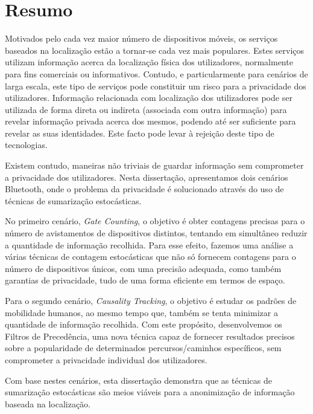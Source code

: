\chapter*{Resumo}
Motivados pelo cada vez maior número de dispositivos móveis, os
serviços baseados na localização estão a tornar-se cada vez mais
populares.  Estes serviços utilizam informação acerca da localização
física dos utilizadores, normalmente para fins comerciais ou
informativos. Contudo, e particularmente para cenários de larga
escala, este tipo de serviços pode constituir um risco para a
privacidade dos utilizadores. Informação relacionada com localização
dos utilizadores pode ser utilizada de forma direta ou indireta
(associada com outra informação) para revelar informação privada
acerca dos mesmos, podendo até ser suficiente para revelar as suas
identidades.  Este facto pode levar à rejeição deste tipo de
tecnologias.

Existem contudo, maneiras não triviais de guardar informação sem
comprometer a privacidade dos utilizadores.  Nesta dissertação,
apresentamos dois cenários Bluetooth, onde o problema da privacidade é
solucionado através do uso de técnicas de sumarização estocásticas.

No primeiro cenário, \textit{Gate Counting}, o objetivo é obter
contagens precisas para o número de avistamentos de dispositivos
distintos, tentando em simultâneo reduzir a quantidade de informação
recolhida. Para esse efeito, fazemos uma análise a várias técnicas de
contagem estocásticas que não só fornecem contagens para o número de
dispositivos únicos, com uma precisão adequada, como também garantias
de privacidade, tudo de uma forma eficiente em termos de espaço.

Para o segundo cenário, \textit{Causality Tracking}, o objetivo é
estudar os padrões de mobilidade humanos, ao mesmo tempo que, também
se tenta minimizar a quantidade de informação recolhida.  Com este
propósito, desenvolvemos os Filtros de Precedência, uma nova técnica
capaz de fornecer resultados precisos sobre a popularidade de
determinados percursos/caminhos específicos, sem comprometer a
privacidade individual dos utilizadores.

Com base nestes cenários, esta dissertação demonstra que as técnicas
de sumarização estocásticas são meios viáveis para a anonimização de
informação baseada na localização.

